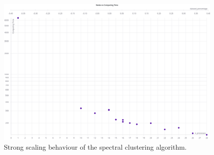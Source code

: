 \begin{figure}
  \includegraphics[width=0.9\linewidth]{images/strong_scaling_chart.png}
  \caption{Strong scaling behaviour of the spectral clustering algorithm.}\label{fig:strong_scaling}
\end{figure}
